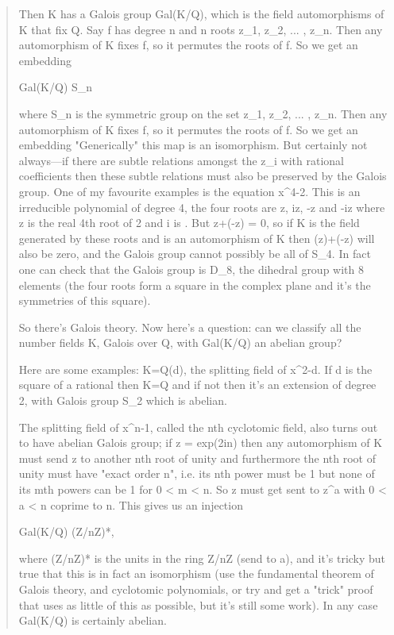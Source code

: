 \begin{quote}
 Then K has a Galois group Gal(K/Q), which is the field automorphisms 
 of K that fix Q.  Say f has degree n and n roots z_{1}, z_{2}, ... , z_{n}. 
 Then any automorphism of K fixes f, so it permutes the roots of f. 
 So we get an embedding 

 Gal(K/Q) \to  S_{n}

 where S_{n} is the symmetric group on the set  z_{1}, z_{2}, ... , z_{n}. 
 Then any automorphism of K fixes f, so it permutes the roots of f. 
 So we get an embedding 
 "Generically" this map is an isomorphism. But certainly not 
 always---if there are subtle relations amongst the z_{i} with 
 rational coefficients then these subtle relations must also be 
 preserved by the Galois group.  One of my favourite examples is the 
 equation x^{4}-2.  This is an irreducible polynomial of degree 4, 
 the four roots are z, iz, -z and -iz where z is the real 4th root 
 of 2 and i is .  But z+(-z) = 0, so if K is the field 
 generated by these roots and \sigma  is an automorphism of K then 
 \sigma (z)+\sigma (-z) will also be zero, and the Galois group cannot 
 possibly be all of S_{4}.  In fact one can check that the Galois group 
 is D_{8}, the dihedral group with 8 elements (the four roots form a 
 square in the complex plane and it's the symmetries of this square).

 So there's Galois theory. Now here's a question: can we classify
 all the number fields K, Galois over Q, with Gal(K/Q) an abelian group?

 Here are some examples: K=Q(\sqrt d), the splitting field of x^{2}-d.
 If d is the square of a rational then K=Q and if not then it's
 an extension of degree 2, with Galois group S_{2} which is abelian.

 The splitting field of x^{n}-1, called the nth cyclotomic field,
 also turns out to have abelian Galois group; if z = exp(2\pi in)
 then any automorphism of K must send z to another nth root of 
 unity and furthermore the nth root of unity must have "exact 
 order n", 
 i.e. its nth power must be 1 but none of its mth powers can be 1 
 for 0 < m < n.  So z must get sent to z^{a} with 0 < a < n coprime to n. 
 This gives us an injection 

 Gal(K/Q) \to  (Z/nZ)*,

 where (Z/nZ)* is the units in the ring Z/nZ (send \sigma  to a),
 and it's tricky but true that this is in fact an isomorphism 
 (use the fundamental theorem of Galois theory, and cyclotomic 
 polynomials, or try and get a "trick" proof that uses as little 
 of this as possible, but it's still some work). In any case Gal(K/Q) 
 is certainly abelian.


\end{quote}
